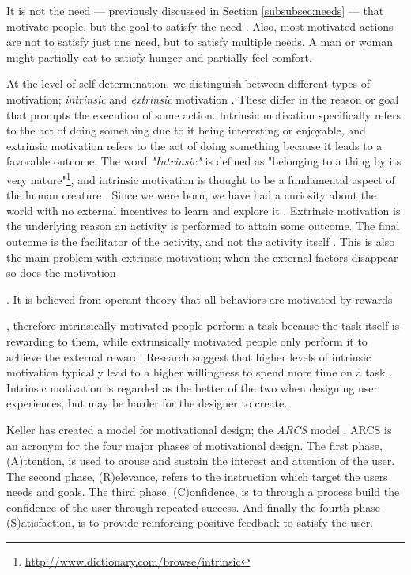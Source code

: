 It is not the need --- previously discussed in Section \ref{subsubsec:needs} --- that motivate people, but the goal to satisfy the need \cite{Maslow1943}. Also, most motivated actions are not to satisfy just one need, but to satisfy multiple needs. A man or woman might partially eat to satisfy hunger and partially feel comfort.

At the level of self-determination, we distinguish between different types of motivation; \textit{intrinsic} and \textit{extrinsic} motivation \cite{Ryan2000a}. These differ in the reason or goal that prompts the execution of some action. Intrinsic motivation specifically refers to the act of doing something due to it being interesting or enjoyable, and extrinsic motivation refers to the act of doing something because it leads to a favorable outcome. The word \textit{"Intrinsic"} is defined as "belonging to a thing by its very nature"\footnote{\url{http://www.dictionary.com/browse/intrinsic}}, and intrinsic motivation is thought to be a fundamental aspect of the human creature \cite{White1959}. Since we were born, we have had a curiosity about the world with no external incentives to learn and explore it \cite{Ryan2000a}. Extrinsic motivation is the underlying reason an activity is performed to attain some outcome. The final outcome is the facilitator of the activity, and not the activity itself \cite{Ryan2000a}. This is also the main problem with extrinsic motivation; when the external factors disappear so does the motivation. It is believed from operant theory that all behaviors are motivated by rewards, therefore intrinsically motivated people perform a task because the task itself is rewarding to them, while extrinsically motivated people only perform it to achieve the external reward. Research suggest that higher levels of intrinsic motivation typically lead to a higher willingness to spend more time on a task \cite{Deci1975}. Intrinsic motivation is regarded as the better of the two when designing user experiences, but may be harder for the designer to create.

Keller has created a model for motivational design; the \textit{ARCS} model \cite{Keller1987}. ARCS is an acronym for the four major phases of motivational design. The first phase, (A)ttention, is used to arouse and sustain the interest and attention of the  user. The second phase, (R)elevance, refers to the instruction which target the users needs and goals. The third phase, (C)onfidence, is to through a process build the confidence of the user through repeated success. And finally the fourth phase (S)atisfaction, is to provide reinforcing positive feedback to satisfy the user.

